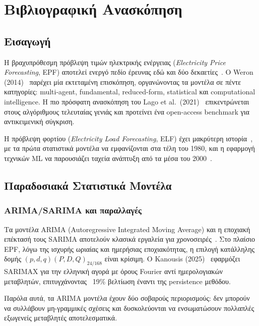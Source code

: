 \chapter{Βιβλιογραφική Ανασκόπηση}
\label{ch:literature}

\section{Εισαγωγή}

Η βραχυπρόθεσμη πρόβλεψη τιμών ηλεκτρικής ενέργειας (\textit{Electricity Price Forecasting}, EPF)
αποτελεί ενεργό πεδίο έρευνας εδώ και δύο δεκαετίες~\cite{weron2014electricity}. Ο Weron
(2014)~\cite{weron2014electricity} παρέχει μία εκτεταμένη επισκόπηση, οργανώνοντας τα μοντέλα σε
πέντε κατηγορίες: multi-agent, fundamental, reduced-form, statistical και computational intelligence.
Η πιο πρόσφατη ανασκόπηση του Lago et al.\ (2021)~\cite{lago2021} επικεντρώνεται στους αλγόριθμους
τελευταίας γενιάς και προτείνει ένα open-access benchmark για αντικειμενική σύγκριση.

Η πρόβλεψη φορτίου (\textit{Electricity Load Forecasting}, ELF) έχει μακρύτερη ιστορία~\cite{gross1987},
με τα πρώτα στατιστικά μοντέλα να εμφανίζονται στα τέλη του 1980, και η εφαρμογή τεχνικών ML να
παρουσιάζει ταχεία ανάπτυξη από τα μέσα του 2000~\cite{hong2020}.


\section{Παραδοσιακά Στατιστικά Μοντέλα}
\label{sec:stat_models}

\subsection{ARIMA/SARIMA και παραλλαγές}

Τα μοντέλα ARIMA (Autoregressive Integrated Moving Average) και η εποχιακή επέκτασή τους SARIMA
αποτελούν κλασικά εργαλεία για χρονοσειρές~\cite{box2015}. Στο πλαίσιο EPF, λόγω της ισχυρής
ωριαίας και ημερήσιας εποχιακότητας, η επιλογή κατάλληλης δομής $(p,d,q)(P,D,Q)_{24/168}$ είναι
κρίσιμη. Ο Kanousis (2025)~\cite{kanousis2025} εφαρμόζει SARIMAX για την ελληνική αγορά με όρους
Fourier αντί ημερολογιακών μεταβλητών, επιτυγχάνοντας ~19\% βελτίωση έναντι της persistence μεθόδου.

Παρόλα αυτά, τα ARIMA μοντέλα έχουν δύο σοβαρούς περιορισμούς: δεν μπορούν να συλλάβουν μη-γραμμικές
σχέσεις και δυσκολεύονται να ενσωματώσουν πολλαπλές εξωγενείς μεταβλητές αποτελεσματικά.

